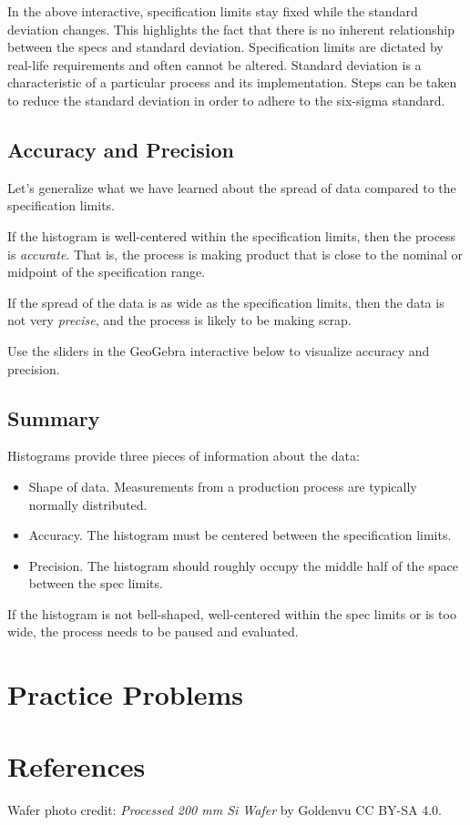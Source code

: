\documentclass{ximera}
\begin{document}
\begin{onlineOnly}
\begin{center} 
\end{center}
\end{onlineOnly}

In the above interactive, specification limits stay fixed while the standard deviation changes.  This highlights the fact that there is no inherent relationship between the specs and standard deviation.  Specification limits are dictated by real-life requirements and often cannot be altered.  Standard deviation is a characteristic of a particular process and its implementation.  Steps can be taken to reduce the standard deviation in order to adhere to the six-sigma standard.

\subsection*{Accuracy and Precision}

Let's generalize what we have learned about the spread of data compared to the specification limits.

If the histogram is well-centered within the specification limits, then the process is \emph{accurate}. That is, the process is making product that is close to the nominal or midpoint of the specification range.

If the spread of the data is as wide as the specification limits, then the data is not very \emph{precise}, and the process is likely to be making scrap.

Use the sliders in the GeoGebra interactive below to visualize accuracy and precision.
\begin{onlineOnly}
\begin{center} 
\end{center}
\end{onlineOnly}

\subsection*{Summary}
Histograms provide three pieces of information about the data:
\begin{itemize}
    \item Shape of data.  Measurements from a production process are typically normally distributed.  
    \item Accuracy.  The histogram must be centered between the specification limits.  
    \item Precision.  The histogram should roughly occupy the middle half of the space between the spec limits. 
\end{itemize}
If the histogram is not bell-shaped, well-centered within the spec limits or is too wide, the process needs to be paused and evaluated.



\section*{Practice Problems}

\section*{References}
Wafer photo credit: \textit{Processed 200 mm Si Wafer} by Goldenvu CC BY-SA 4.0.
\end{document}
